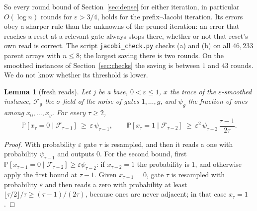 \documentclass[11pt]{amsart}
\newtheorem{lemma}[theorem]{Lemma}
\theoremstyle{definition}
\theoremstyle{remark}
\newcommand{\eps}{\varepsilon}
\newcommand{\PP}{\mathbb{P}}
\newcommand{\cF}{\mathcal{F}}
\begin{document}
\noindent So every round bound of Section~\ref{sec:dense} for either iteration, in particular $O(\log n)$ rounds for
$\eps>3/4$, holds for the prefix--Jacobi iteration. Its errors obey a sharper rule than the
unknowns of the pruned iteration: an error that reaches a reset at a relevant gate always stops
there, whether or not that reset's own read is correct. The script \texttt{jacobi\_check.py}
checks (a) and (b) on all $46{,}233$ parent arrays with $n\le8$; the largest saving there is two
rounds. On the smoothed instances of Section~\ref{sec:checks} the saving is between $1$ and $43$
rounds. We do not know whether its threshold is lower.

\begin{lemma}[fresh reads]\label{lem:fresh}
Let $j$ be a base, $0<\eps\le1$, $x$ the trace of the $\eps$-smoothed instance, $\cF_g$ the
$\sigma$-field of the noise of gates $1,\dots,g$, and $\psi_g$ the fraction of ones among
$x_0,\dots,x_g$. For every $\tau\ge2$,
\[
\PP[x_\tau=0\mid\cF_{\tau-1}]\ \ge\ \eps\,\psi_{\tau-1},
\qquad
\PP[x_\tau=1\mid\cF_{\tau-2}]\ \ge\ \eps^2\,\psi_{\tau-2}\,\frac{\tau-1}{2\tau}.
\]
\end{lemma}

\begin{proof}
With probability $\eps$ gate $\tau$ is resampled, and then it reads a one with probability
$\psi_{\tau-1}$ and outputs $0$. For the second bound, first $\PP[x_{\tau-1}=0\mid\cF_{\tau-2}]\ge
\eps\psi_{\tau-2}$: if $x_{\tau-2}=1$ the probability is $1$, and otherwise apply the first bound
at $\tau-1$. Given $x_{\tau-1}=0$, gate $\tau$ is resampled with probability $\eps$ and then reads
a zero with probability at least $\lfloor\tau/2\rfloor/\tau\ge(\tau-1)/(2\tau)$, because ones are
never adjacent; in that case $x_\tau=1$.
\end{proof}
\end{document}
